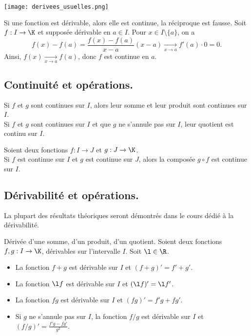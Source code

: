 \documentclass[11pt]{article}
\begin{document}
\begin{center}
    \texttt{[image: derivees\_usuelles.png]}
\end{center}

\begin{prop}{}{}
    Si une fonction est dérivable, alors elle est continue, la réciproque est fausse.
    \tcblower
    Soit $f:I\to \K$ et supposée dérivable en $a\in I$. Pour $x\in I\setminus\{a\}$, on a
    \begin{equation*}
        f(x)-f(a)=\frac{f(x)-f(a)}{x-a}(x-a)\xrightarrow[x\to a]{} f'(a)\cdot 0 = 0.
    \end{equation*}
    Ainsi, $f(x)\xrightarrow[x\to a]{}f(a)$, donc $f$ est continue en $a$.
\end{prop}

\subsection{Continuité et opérations.}

\begin{prop}{}{}
    Si $f$ et $g$ sont continues sur $I$, alors leur somme et leur produit sont continues sur $I$.\\
    Si $f$ et $g$ sont continues sur $I$ et que $g$ ne s'annule pas sur $I$, leur quotient est continu sur $I$.
\end{prop}

\begin{prop}{}{}
    Soient deux fonctions $f:I\to J$ et $g:J\to\K$.\\
    Si $f$ est continue sur $I$ et $g$ est continue sur $J$, alors la composée $g\circ f$ est continue sur $I$.
\end{prop}

\subsection{Dérivabilité et opérations.}

La plupart des résultats théoriques seront démontrés dans le cours dédié à la dérivabilité.

\begin{prop}{Dérivée d'une somme, d'un produit, d'un quotient.}{}
    Soient deux fonctions $f,g:I\to\K$, dérivables sur l'intervalle $I$. Soit $\l\in\R$.
    \begin{itemize}
        \item La fonction $f+g$ est dérivable sur $I$ et $(f+g)'=f'+g'$.
        \item La fonction $\l f$ est dérivable sur $I$ et $(\l f)'=\l f'$.
        \item La fonction $fg$ est dérivable sur $I$ et $(fg)'=f'g+fg'$.
        \item Si $g$ ne s'annule pas sur $I$, la fonction $f/g$ est dérivable sur $I$ et $(f/g)'=\frac{f'g-fg'}{g^2}$.
    \end{itemize}
\end{prop}
\end{document}
